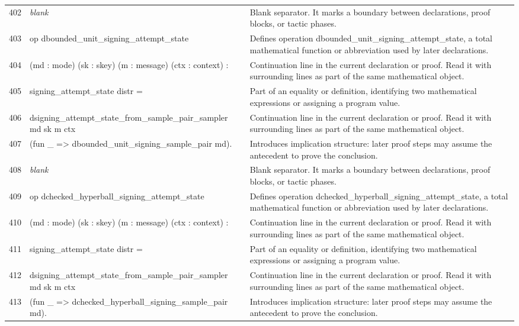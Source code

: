 \documentclass[10pt]{article}
\begin{document}
\begin{longtable}{r L{0.53\textwidth} L{0.37\textwidth}}
402 & {\ttfamily\scriptsize \emph{blank}} & Blank separator.  It marks a boundary between declarations, proof blocks, or tactic phases. \\
403 & {\ttfamily\scriptsize op dbounded\_unit\_signing\_attempt\_state} & Defines operation dbounded\_unit\_signing\_attempt\_state, a total mathematical function or abbreviation used by later declarations. \\
404 & {\ttfamily\scriptsize    (md : mode) (sk : skey) (m : message) (ctx : context) :} & Continuation line in the current declaration or proof.  Read it with surrounding lines as part of the same mathematical object. \\
405 & {\ttfamily\scriptsize    signing\_attempt\_state distr =} & Part of an equality or definition, identifying two mathematical expressions or assigning a program value. \\
406 & {\ttfamily\scriptsize   dsigning\_attempt\_state\_from\_sample\_pair\_sampler md sk m ctx} & Continuation line in the current declaration or proof.  Read it with surrounding lines as part of the same mathematical object. \\
407 & {\ttfamily\scriptsize     (fun \_ => dbounded\_unit\_signing\_sample\_pair md).} & Introduces implication structure: later proof steps may assume the antecedent to prove the conclusion. \\
408 & {\ttfamily\scriptsize \emph{blank}} & Blank separator.  It marks a boundary between declarations, proof blocks, or tactic phases. \\
409 & {\ttfamily\scriptsize op dchecked\_hyperball\_signing\_attempt\_state} & Defines operation dchecked\_hyperball\_signing\_attempt\_state, a total mathematical function or abbreviation used by later declarations. \\
410 & {\ttfamily\scriptsize    (md : mode) (sk : skey) (m : message) (ctx : context) :} & Continuation line in the current declaration or proof.  Read it with surrounding lines as part of the same mathematical object. \\
411 & {\ttfamily\scriptsize    signing\_attempt\_state distr =} & Part of an equality or definition, identifying two mathematical expressions or assigning a program value. \\
412 & {\ttfamily\scriptsize   dsigning\_attempt\_state\_from\_sample\_pair\_sampler md sk m ctx} & Continuation line in the current declaration or proof.  Read it with surrounding lines as part of the same mathematical object. \\
413 & {\ttfamily\scriptsize     (fun \_ => dchecked\_hyperball\_signing\_sample\_pair md).} & Introduces implication structure: later proof steps may assume the antecedent to prove the conclusion. \\

\end{longtable}
\end{document}
